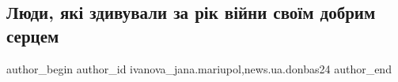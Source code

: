  
 
 
 
 
 
\subsection{Люди, які здивували за рік війни своїм добрим серцем}
\label{sec:21_02_2023.stz.news.ua.donbas24.3.ljudy_zdyvuvaly_za_rik_vijny_dobrym_sercem}
 
\ifcmt
 author_begin
   author_id ivanova_jana.mariupol,news.ua.donbas24
 author_end
\fi
